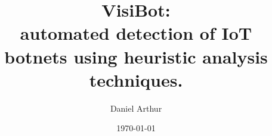 \documentclass{l4proj}
\begin{document}
\title{VisiBot:\\automated detection of IoT botnets using heuristic analysis techniques.}
\author{Daniel Arthur}
\date{\today}

\maketitle



\def\consentname {Daniel Arthur}
\def\consentdate {\today}
\educationalconsent

\tableofcontents










% 


\end{document}
